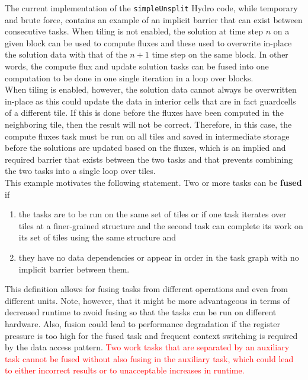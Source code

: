 \documentclass{article}
\begin{document}
The current implementation of the \texttt{simpleUnsplit} Hydro code, while temporary and
brute force, contains an example of an implicit barrier that can exist between
consecutive tasks.  When tiling is not enabled, the solution at time step $n$ on
a given block can be used to compute fluxes and these used to overwrite in-place
the solution data with that of the $n+1$ time step on the same block.  In other
words, the compute flux and update solution tasks can be fused into one
computation to be done in one single iteration in a loop over blocks.\\

When tiling is enabled, however, the solution data cannot always be overwritten
in-place as this could update the data in interior cells that are in fact
guardcells of a different tile.  If this is done before the fluxes have been
computed in the neighboring tile, then the result will not be correct.
Therefore, in this case, the compute fluxes task must be run on all tiles and
saved in intermediate storage before the solutions are updated based on the
fluxes, which is an implied and required barrier that exists between
the two tasks and that prevents combining the two tasks into a single loop over
tiles.\\


This example motivates the following statement.  Two or more tasks can be
\textbf{fused} if
\begin{enumerate}
\item{the tasks are to be run on the same set of tiles or if one task 
iterates over tiles at a finer-grained structure and the second task can
complete its work on its set of tiles using the same structure and}
\item{they have no data dependencies or appear in order in the task graph with
no implicit barrier between them.}
\end{enumerate}
This definition allows for fusing tasks from different operations and even from
different units.
Note, however, that it might be more advantageous in terms of decreased runtime
to avoid fusing so that the tasks can be run on different hardware.  Also,
fusion could lead to performance degradation if the register pressure is too
high for the fused task and frequent context switching is required by the data
access pattern.  \textcolor{red}{Two work tasks that are separated by
an auxiliary task cannot be fused without also fusing in the auxiliary task,
which could lead to either incorrect results or to unacceptable increases in
runtime.}\\
\end{document}
